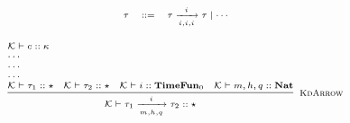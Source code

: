 \documentclass[fleqn]{article}
\begin{document}
\[
\scriptsize
\begin{array}{rcl}
\tau & ::= & \tau \xrightarrow[i,i,i]{i} \tau \mid \cdots
\end{array}
\]

\[
\scriptsize
\begin{array}{l}
\mathcal{K} \vdash c :: \kappa \\
\cdots \\
\cdots \\
\cdots \\
\infer[\textsc{KdArrow}]{\mathcal{K} \vdash \tau_1 \xrightarrow[m,h,q]{i} \tau_2 :: \star}{\mathcal{K} \vdash \tau_1 :: \star & \mathcal{K} \vdash \tau_2 :: \star & \mathcal{K} \vdash i :: \mathbf{TimeFun}_0 & \mathcal{K} \vdash m,h,q :: \mathbf{Nat}}
\end{array}
\]

\newcommand{\jtygc}[9]{#1 \vdash #2 : #3 \triangleright #4 \mid (#5, #6, #7, #8) \triangleleft #9}
\end{document}
